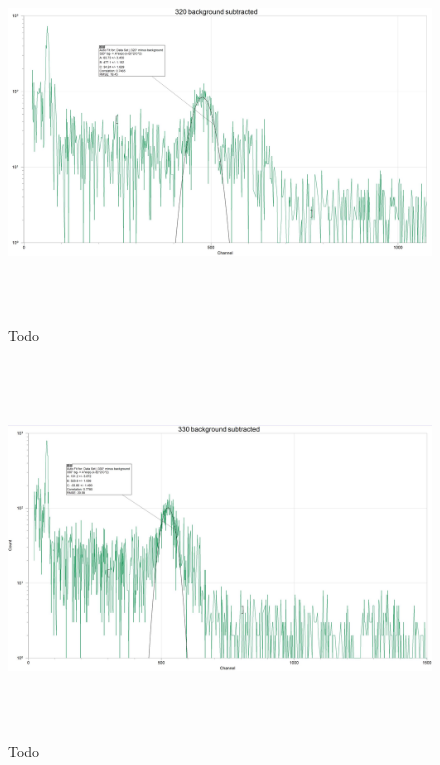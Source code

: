 \documentclass[fleqn]{article}
\begin{document}
  \begin{figure}[htbp]
    \includegraphics[height=10cm, width=18cm]{Nine.JPG}
    \caption{
      Todo
    }
  \end{figure}

  \pagebreak

  \begin{figure}[htbp]
    \includegraphics[height=10cm, width=18cm]{Ten.JPG}
    \caption{
      Todo
    }
  \end{figure}

  \pagebreak
\end{document}
